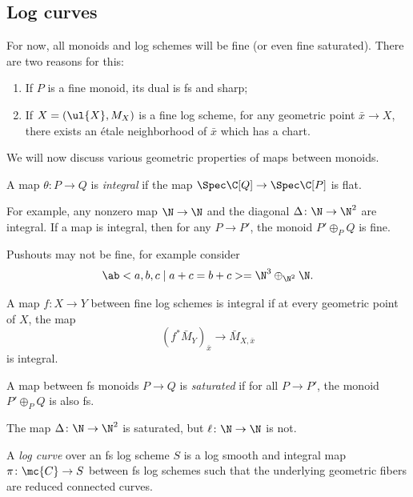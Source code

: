 \subsection{Log curves}%
\label{sub:Log curves}

For now, all monoids and log schemes will be fine (or even fine saturated). There are two reasons for this:
\begin{enumerate}
    \item If \(P\) is a fine monoid, its dual is fs and sharp;
    \item If \(X = (\ul{X}, M_X)\) is a fine log scheme, for any geometric point \(\bar{x} \to X\), there exists an \'etale neighborhood of \(\bar{x}\) which has a chart.
\end{enumerate}

We will now discuss various geometric properties of maps between monoids.
\begin{defn}
    A map \(\theta \colon P \to Q\) is \textit{integral} if the map \(\Spec\C[Q] \to \Spec \C[P]\) is flat.
\end{defn}

For example, any nonzero map \(\N \to \N\) and the diagonal \(\Delta \colon\N \to \N^2\) are integral. If a map is integral, then for any \(P \to P'\), the monoid \(P' \oplus_P Q\) is fine.

\begin{exm}
    Pushouts may not be fine, for example consider
    \[ \ab< a ,b,c \mid a+c=b+c> = \N^3 \oplus_{\N^2} \N. \]
\end{exm}

\begin{defn}
    A map \(f \colon X \to Y\) between fine log schemes is integral if at every geometric point of \(X\), the map
    \[ (f^*\bar{M}_Y)_{\bar{x}} \to \bar{M}_{X,\bar{x}} \]
    is integral.
\end{defn}

\begin{defn}
    A map between fs monoids \(P \to Q\) is \textit{saturated} if for all \(P \to P'\), the monoid \(P' \oplus_P Q\) is also fs.
\end{defn}

\begin{exm}
    The map \(\Delta \colon \N \to \N^2\) is saturated, but \(\ell \colon \N \to \N\) is not.
\end{exm}

\begin{defn}
    A \textit{log curve} over an fs log scheme \(S\) is a log smooth and integral map \(\pi \colon \mc{C} \to S\) between fs log schemes such that the underlying geometric fibers are reduced connected curves.
\end{defn}

